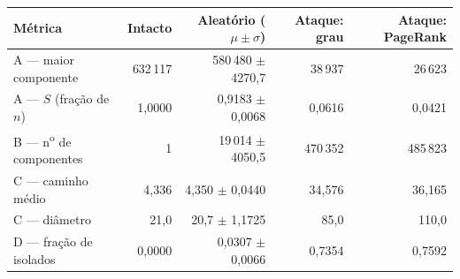 \begin{tabular}{lrrrr}
\hline
\textbf{Métrica} & \textbf{Intacto} & \textbf{Aleatório ($\mu\pm\sigma$)} & \textbf{Ataque: grau} & \textbf{Ataque: PageRank} \\ \hline
A --- maior componente & 632\,117 & 580\,480 $\pm$ 4270,7 & 38\,937 & 26\,623 \\
A --- $S$ (fração de $n$) & 1,0000 & 0,9183 $\pm$ 0,0068 & 0,0616 & 0,0421 \\
B --- n\textsuperscript{o} de componentes & 1 & 19\,014 $\pm$ 4050,5 & 470\,352 & 485\,823 \\
C --- caminho médio & 4,336 & 4,350 $\pm$ 0,0440 & 34,576 & 36,165 \\
C --- diâmetro & 21,0 & 20,7 $\pm$ 1,1725 & 85,0 & 110,0 \\
D --- fração de isolados & 0,0000 & 0,0307 $\pm$ 0,0066 & 0,7354 & 0,7592 \\
\hline
\end{tabular}
